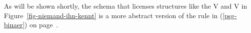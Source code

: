As will be shown shortly, the schema that licenses structures like the V \eliste{} and V   in
Figure~\ref{fig-niemand-ihn-kennt} is a more abstract version of the rule in (\ref{psg-binaer}) on page~\pageref{psg-binaer}.



%

